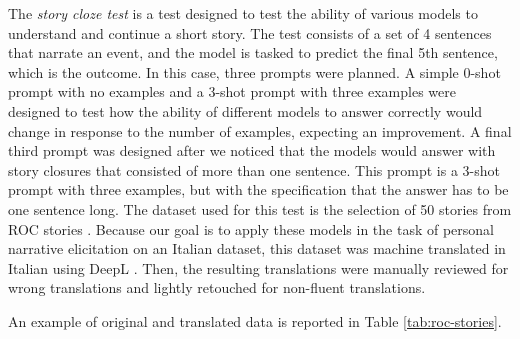 The \emph{story cloze test} \cite{mostafazadeh2016corpus} is a test designed to test the ability of various models to understand and continue a short story. The test consists of a set of 4 sentences that narrate an event, and the model is tasked to predict the final 5th sentence, which is the outcome. In this case, three prompts were planned. A simple 0-shot prompt with no examples and a 3-shot prompt with three examples were designed to test how the ability of different models to answer correctly would change in response to the number of examples, expecting an improvement. A final third prompt was designed after we noticed that the models would answer with story closures that consisted of more than one sentence. This prompt is a 3-shot prompt with three examples, but with the specification that the answer has to be one sentence long. The dataset used for this test is the selection of 50 stories from ROC stories \cite{mostafazadeh2016corpus}. Because our goal is to apply these models in the task of personal narrative elicitation on an Italian dataset, this dataset was machine translated in Italian using DeepL \cite{deepl}. Then, the resulting translations were manually reviewed for wrong translations and lightly retouched for non-fluent translations.

An example of original and translated data is reported in Table \ref{tab:roc-stories}.


